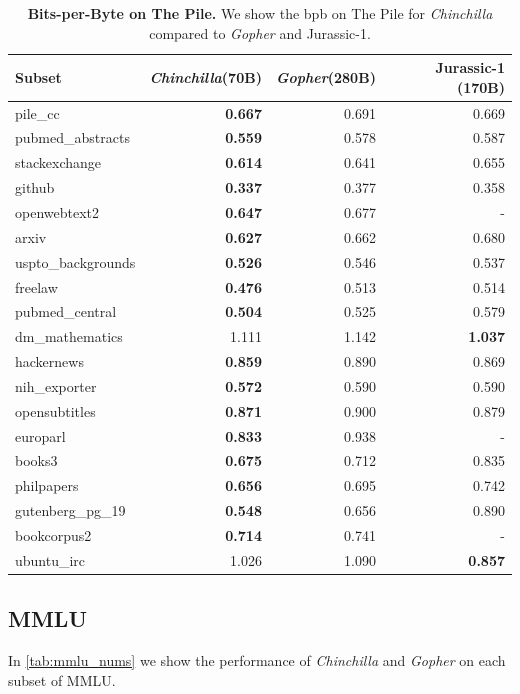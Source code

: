 \documentclass[11pt, a4paper, logo, copyright, nonumbering]{deepmind}
\newcommand{\gopher}{\textit{Gopher}\xspace}
\newcommand{\chinchilla}{\textit{Chinchilla}\xspace}
\begin{document}
\begin{table}[h!]
    \centering
\begin{tabular}{lrrr}
\toprule
Subset &         \chinchilla (70B) &         \gopher (280B) &         Jurassic-1 (170B) \\
\midrule
pile\_cc            & \textbf{0.667} & 0.691 & 0.669 \\
pubmed\_abstracts   & \textbf{0.559} & 0.578 & 0.587 \\
stackexchange      & \textbf{0.614} & 0.641 & 0.655 \\
github             & \textbf{0.337} & 0.377 & 0.358 \\
openwebtext2       & \textbf{0.647} & 0.677 &   -  \\
arxiv              & \textbf{0.627} & 0.662 & 0.680 \\
uspto\_backgrounds  & \textbf{0.526} & 0.546 & 0.537 \\
freelaw            & \textbf{0.476} & 0.513 & 0.514 \\
pubmed\_central     & \textbf{0.504} & 0.525 & 0.579 \\
dm\_mathematics     & 1.111 & 1.142 & \textbf{1.037} \\
hackernews         & \textbf{0.859} & 0.890 & 0.869 \\
nih\_exporter       & \textbf{0.572} & 0.590 & 0.590 \\
opensubtitles      & \textbf{0.871} & 0.900 & 0.879 \\
europarl           & \textbf{0.833} & 0.938 & - \\
books3             & \textbf{0.675} & 0.712 & 0.835 \\
philpapers         & \textbf{0.656} & 0.695 & 0.742 \\
gutenberg\_pg\_19    & \textbf{0.548} & 0.656 & 0.890 \\
bookcorpus2        & \textbf{0.714} & 0.741 &   -  \\
ubuntu\_irc         & 1.026 & 1.090 & \textbf{0.857} \\
\bottomrule
\end{tabular}
    \caption{\textbf{Bits-per-Byte on The Pile.} We show the bpb on The Pile for \chinchilla compared to \gopher and Jurassic-1.}
    \label{tab:pile_nums}
\end{table}

\subsection{MMLU}
In \autoref{tab:mmlu_nums} we show the performance of \chinchilla and \gopher on each subset of MMLU.
\end{document}
